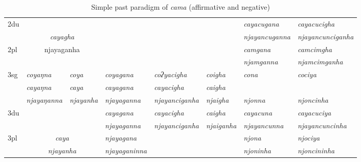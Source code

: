 \begin{landscape}
\begin{table}[p]
{{\begin{tabular}{|l||p{2.4cm}|p{1.5cm}|p{2.4cm}|p{2.4cm}|p{2.4cm}|p{3.2cm}|p{3.2cm}|}
{\sc 2du}		& \multicolumn{2}{c|}{}     & \multicolumn{3}{c|}{\cellcolor[gray]{.8}} & \it  cayacugana  & \it   cayacucigha \\
		& \multicolumn{2}{c|}{\it cayagha} & \multicolumn{3}{c|}{ \cellcolor[gray]{.8}}& \it njayancuganna  & \it  njayancunciganha \\
 \cline{1-1} \cline{7-8}			
{\sc 2pl}	& \multicolumn{2}{c|}{njayaganha} & \multicolumn{3}{c|}{\cellcolor[gray]{.8} }& \it  camgana& \it  camcimgha  \\
		& 	\multicolumn{2}{c|}{ }& \multicolumn{3}{c|}{\cellcolor[gray]{.8} }& \it  njamganna & \it  njamcimganha \\
\hline			
{\sc 3sg}	& \it coyaŋna	\ti  & \it 	 coya   \ti  	& \it   	coyagana		\ti & \it   coʔyacigha \ti  & \it   coigha \ti 	& \it cona & \it cociya \\
					& \it cayaŋna	  & \it 	      caya	& \it  cayagana 			& \it  cayacigha   & \it   caigha	& \it  & \it  \\
					& \it  njayaŋanna   & \it   njayanha 	& \it  njayaganna& \it  njayanciganha & \it  njaigha  & \it njonna& \it njoncinha\\
\hline
{\sc 3du }		&  \multicolumn{2}{c|}{}& \it cayagana& \it cayacigha & \it    caigha& \it   cayacuna & \it   cayacuciya\\
		& \multicolumn{2}{c|}{}& \it   	njayaganna	& \it njayanciganha	& \it  njaiganha& \it  njayancunna & \it njayancuncinha \\
 \cline{1-1} \cline{4-4} \cline{7-8}	
{\sc 3pl}		& \multicolumn{2}{c|}{\it caya}& \it njayagana& \it & \it  & \it njona& \it njociya\\	
	& \multicolumn{2}{c|}{\it  njayanha}			& \it njayaganinna& \it  & \it  & \it njoninha& \it njoncininha \\
\hline
\end{tabular}
}
}
\caption{Simple past  paradigm of \emph{cama}  (affirmative and negative)}\label{par-cama-pst}
\end{table}



\end{landscape}
